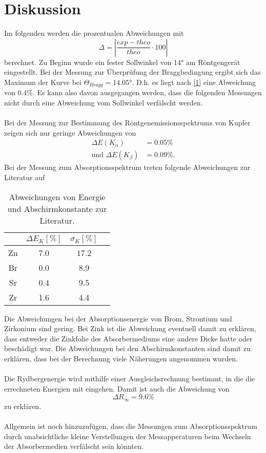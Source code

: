\section{Diskussion}
\label{sec:Diskussion}
Im folgenden werden die prozentualen Abweichungen mit 
\begin{equation}\label{1}
    \Delta = |\frac{exp - theo}{theo} \cdot 100|
\end{equation}
berechnet.
Zu Beginn wurde ein fester Sollwinkel von 14° am Röntgengerät eingestellt. Bei der Messung zur Überprüfung der Braggbedingung 
ergibt sich das Maximum der Kurve bei $\Theta_{Bragg} = 14.05°$. D.h. es liegt nach \autoref{1} eine Abweichung von 0.4\%.
Es kann also davon ausgegangen werden, dass die folgenden Messungen nicht durch eine Abweichung vom Sollwinkel verfälscht werden.
\\
\\
Bei der Messung zur Bestimmung des Röntgenemissionsspektrums von Kupfer zeigen sich nur geringe Abweichungen von
\begin{align*}
    \Delta E(K_{\alpha}) &= 0.05\%\\
    \text{und } \Delta E(K_{\beta}) &= 0.09\%.
\end{align*}
Bei der Messung zum Absorptionsspektrum treten folgende Abweichungen zur Literatur \cite{energie_k} auf
\begin{table}\label{tab:2}
    \centering
    \begin{tabular}{c c c c}
        \toprule
        {} & {$\Delta E_{K}\left[\unit{\%}\right]$} & {$\sigma_{K}\left[\unit{\%}\right]$}\\
        \midrule
        Zn & 7.0 & 17.2\\
        Br & 0.0 & 8.9 \\
        Sr & 0.4 & 9.5 \\
        Zr & 1.6 & 4.4 \\       
        \bottomrule
    \end{tabular}
    \caption{Abweichungen von Energie und Abschirmkonstante zur Literatur.}
  \end{table}
Die Abweichungen bei der Absorptionsenergie von Brom, Strontium und Zirkonium sind gering. Bei Zink ist die Abweichung eventuell damit zu erklären, dass entweder die Zinkfolie
des Absorbermediums eine andere Dicke hatte oder beschädigt war. 
Die Abweichungen bei den Abschirmkonstanten sind damit zu erklären, dass bei der Berechnung viele Näherungen angenommen wurden. 
\\
\\
Die Rydbergenergie wird mithilfe einer Ausgleichsrechnung bestimmt, in die die errechneten Energien mit eingehen. Damit ist auch die Abweichung von 
\begin{equation*}
    \Delta R_{\infty} = 9.6\%
\end{equation*}
zu erklären.
\\
\\
Allgemein ist noch hinzuzufügen, dass die Messungen zum Absorptionsspektrum durch unabsichtliche kleine Verstellungen der Messapperaturen beim Wechseln der
Absorbermedien verfälscht sein könnten. 